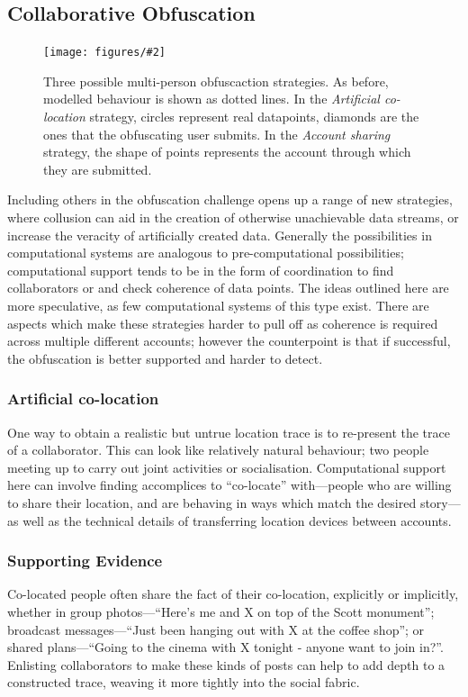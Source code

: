 \documentclass{IOS-Book-Article}     %
\newcommand{\fig}[3][0.9]{
\begin{figure}[tp]
\begin{center}
\texttt{[image: figures/\#2]}
\caption{#3}
\label{fig:#2}
\end{center}
\end{figure}
}
\newcommand{\tbox}[3][red]{{
\color{#1}\noindent{
   \fbox{\scriptsize{ {\bf #2} \textsl{#3}}}
   \vspace{2pt}
}
}}
\newcommand{\todo}[1]{\tbox{TODO:}{#1}}
\begin{document}
\subsection{Collaborative Obfuscation}
\fig[1.0]{MultiPlayerObfuscation}{Three possible multi-person obfuscaction
strategies. As before, modelled behaviour is shown as dotted lines. In the \emph{Artificial
co-location} strategy, circles represent real datapoints, diamonds are the ones that the
obfuscating user submits. In the \emph{Account sharing} strategy, the shape of
points represents the account through which they are submitted. }

Including others in the obfuscation challenge opens up a range of new 
strategies, where collusion can aid in the creation of otherwise unachievable
data streams, or increase the veracity of artificially created data. Generally
the possibilities in computational systems are analogous to pre-computational
possibilities; computational support tends to be in the form of coordination to
find collaborators or and check coherence of data points. The ideas outlined
here are more speculative, as few computational systems of this type exist.
There are aspects which make these strategies harder to pull off as coherence is
required across multiple different accounts; however the counterpoint is
that if successful, the obfuscation is better supported and harder to detect.

\subsubsection{Artificial co-location}
One way to obtain a realistic but untrue location trace is to re-present the
trace of a collaborator. This can look like relatively natural
behaviour; two people meeting up to carry out joint activities or socialisation.
Computational support here can involve finding accomplices to ``co-locate''
with---people who are willing to share their location, and are behaving in ways
which match the desired story---as well as the technical details of
transferring location devices between accounts.

\subsubsection{Supporting Evidence}

Co-located people often share the fact of their co-location, explicitly or
implicitly, whether in group photos---``Here's me and X on top of the Scott
monument''; broadcast messages---``Just been hanging out with X at the coffee
shop''; or shared plans---``Going to the cinema with X tonight - anyone want to
join in?''. Enlisting collaborators to make these kinds of posts can help to add depth to a
constructed trace, weaving it more tightly into the social fabric.
\end{document}
